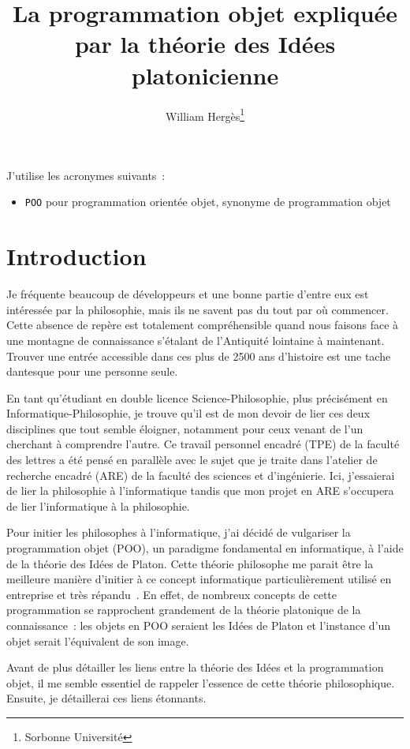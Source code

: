 \documentclass[a4paper, titlepage, 12pt]{article}
\title{La programmation objet expliquée par la théorie des Idées platonicienne}
\author{
	William Hergès\thanks{Sorbonne Université}
}
\begin{document}
	\maketitle
	\tableofcontents
	\newpage

	J'utilise les acronymes suivants~:
	\begin{itemize}
		\item \verb|POO| pour programmation orientée objet, synonyme de programmation objet
	\end{itemize}

	\newpage
	\section{Introduction}
	Je fréquente beaucoup de développeurs et une bonne partie d'entre eux est intéressée par la philosophie, mais ils ne savent pas du tout par où commencer. Cette absence de repère est totalement compréhensible quand nous faisons face à une montagne de connaissance s'étalant de l'Antiquité lointaine à maintenant. Trouver une entrée accessible dans ces plus de 2500 ans d'histoire est une tache dantesque pour une personne seule.

	En tant qu'étudiant en double licence Science-Philosophie, plus précisément en Informatique-Philosophie, je trouve qu'il est de mon devoir de lier ces deux disciplines que tout semble éloigner, notamment pour ceux venant de l'un cherchant à comprendre l'autre. Ce travail personnel encadré (TPE) de la faculté des lettres a été pensé en parallèle avec le sujet que je traite dans l'atelier de recherche encadré (ARE) de la faculté des sciences et d'ingénierie. Ici, j'essaierai de lier la philosophie à l'informatique tandis que mon projet en ARE s'occupera de lier l'informatique à la philosophie.

	Pour initier les philosophes à l'informatique, j'ai décidé de vulgariser la programmation objet (POO), un paradigme fondamental en informatique, à l'aide de la théorie des Idées de Platon. Cette théorie philosophe me parait être la meilleure manière d'initier à ce concept informatique particulièrement utilisé en entreprise et très répandu~\cite{MostUsedLanguages2024}. En effet, de nombreux concepts de cette programmation se rapprochent grandement de la théorie platonique de la connaissance~: les objets en POO seraient les Idées de Platon et l'instance d'un objet serait l'équivalent de son image.

	Avant de plus détailler les liens entre la théorie des Idées et la programmation objet, il me semble essentiel de rappeler l'essence de cette théorie philosophique. Ensuite, je détaillerai ces liens étonnants.
\end{document}
